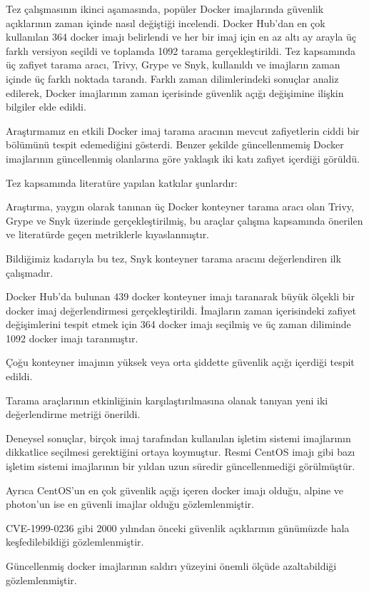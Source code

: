 Tez çalışmasının ikinci aşamasında, popüler Docker imajlarında güvenlik açıklarının zaman içinde nasıl değiştiği incelendi. Docker Hub'dan en çok kullanılan 364 docker imajı belirlendi ve her bir imaj için en az altı ay arayla üç farklı versiyon seçildi ve toplamda 1092 tarama gerçekleştirildi. Tez kapsamında üç zafiyet tarama aracı, Trivy, Grype ve Snyk, kullanıldı ve imajların zaman içinde üç farklı noktada tarandı. Farklı zaman dilimlerindeki sonuçlar analiz edilerek, Docker imajlarının zaman içerisinde güvenlik açığı değişimine ilişkin bilgiler elde edildi.

Araştırmamız en etkili Docker imaj tarama aracının mevcut zafiyetlerin ciddi bir bölümünü tespit edemediğini gösterdi. Benzer şekilde güncellenmemiş Docker imajlarının güncellenmiş olanlarına göre yaklaşık iki katı zafiyet içerdiği görüldü.


Tez kapsamında literatüre yapılan katkılar şunlardır:

\begin{maddelendir}[label=$\bullet$]
    \item Araştırma, yaygın olarak tanınan üç Docker konteyner tarama aracı olan Trivy, Grype ve Snyk üzerinde gerçekleştirilmiş, bu araçlar çalışma kapsamında önerilen ve literatürde geçen metriklerle kıyaslanmıştır.
    \item Bildiğimiz kadarıyla bu tez, Snyk konteyner tarama aracını değerlendiren ilk çalışmadır.
    \item Docker Hub'da bulunan 439 docker konteyner imajı taranarak büyük ölçekli bir docker imaj değerlendirmesi gerçekleştirildi. İmajların zaman içerisindeki zafiyet değişimlerini tespit etmek için 364 docker imajı seçilmiş ve üç zaman diliminde 1092 docker imajı taranmıştır. %
    \item Çoğu konteyner imajının yüksek veya orta şiddette güvenlik açığı içerdiği tespit edildi.
    \item Tarama araçlarının etkinliğinin karşılaştırılmasına olanak tanıyan yeni iki değerlendirme metriği önerildi.
    \item Deneysel sonuçlar, birçok imaj tarafından kullanılan işletim sistemi imajlarının dikkatlice seçilmesi gerektiğini ortaya koymuştur. Resmi CentOS imajı gibi bazı işletim sistemi imajlarının bir yıldan uzun süredir güncellenmediği görülmüştür.
    \item Ayrıca CentOS'un en çok güvenlik açığı içeren docker imajı olduğu, alpine ve photon'un ise en güvenli imajlar olduğu gözlemlenmiştir.
    \item CVE-1999{-}0236 gibi 2000 yılından önceki güvenlik açıklarının günümüzde hala keşfedilebildiği gözlemlenmiştir.
    \item Güncellenmiş docker imajlarının saldırı yüzeyini önemli ölçüde azaltabildiği gözlemlenmiştir.
\end{maddelendir}

